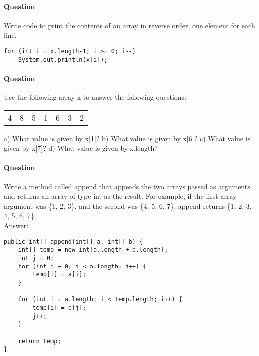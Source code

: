 \documentclass{article}
\begin{document}
\addtocounter{question_num}{1}
\paragraph{Question }
Write code to print the contents of an array in reverse order, one element for each line.
\begin{lstlisting}
for (int i = x.length-1; i >= 0; i--)
	System.out.println(x[i]);
\end{lstlisting}

\addtocounter{question_num}{1}
\paragraph{Question }
Use the following array x to answer the following questions:
\begin{table}[h]
\begin{tabular}{lllllll}
4 & 8 & 5 & 1 & 6 & 3 & 2
\end{tabular}
\end{table}
\newline
a) What value is given by x[1]?
\newline b) What value is given by x[6]?
\newline c) What value is given by x[7]?
\newline d) What value is given by x.length?

\addtocounter{question_num}{1}
\paragraph{Question }
Write a method called append that appends the two arrays passed as arguments and returns an array of type int as the result. For example, if the first array argument was \{1, 2, 3\}, and the second was \{4, 5, 6, 7\}, append returns \{1, 2, 3, 4, 5, 6, 7\}.
\\
{\color{red}Answer:}
\begin{lstlisting}
public int[] append(int[] a, int[] b) {
	int[] temp = new int[a.length + b.length];
	int j = 0;
	for (int i = 0; i < a.length; i++) {
		temp[i] = a[i];
	}

	for (int i = a.length; i < temp.length; i++) {
		temp[i] = b[j];
		j++;
	}

	return temp;
}
\end{lstlisting}
\end{document}
